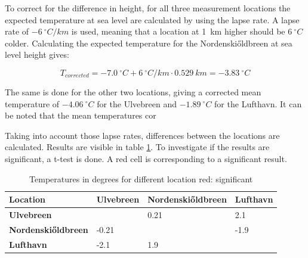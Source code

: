 \documentclass[11pt]{report}
\begin{document}
To correct for the difference in height, for all three measurement locations the expected temperature at sea level are calculated by using the lapse rate. A lapse rate of $\SI{-6}{^{\circ}C/km}$ is used, meaning that a location at \SI{1}{km} higher should be $\SI{6}{^{\circ}C}$ colder.  Calculating the expected temperature for the Nordenski\H{o}ldbreen at sea level height gives:

\begin{equation}
    T_{corrected} = \SI{-7.0}{^\circ C} + \SI{6}{^\circ C/km} \cdot \SI{0.529}{km} = \SI{-3.83}{^\circ C}
    \label{eq:Tatsl}
\end{equation}

The same is done for the other two locations, giving a corrected mean temperature of $\SI{-4.06}{^\circ C}$ for the Ulvebreen and $\SI{-1.89}{^\circ C}$ for the Lufthavn. It can be noted that the mean temperatures cor

Taking into account those lapse rates, differences between the locations are calculated. Results are visible in table \ref{tb:avg}. To investigate if the results are significant, a t-test is done. A red cell is corresponding to a significant result. 

\begin{table}[h]
\begin{tabular}{|l|l|l|l|}
\hline
\textbf{Location}          & \textbf{Ulvebreen}                              & \textbf{Nordenski\H{o}ldbreen}                      & \textbf{Lufthavn}                               \\ \hline
\textbf{Ulvebreen}         & \cellcolor[HTML]{C0C0C0}{\color[HTML]{9B9B9B} } & 0.21                                            & \cellcolor[HTML]{FE996B}2.1                     \\ \hline
\textbf{Nordenski\H{o}ldbreen} & -0.21                                           & \cellcolor[HTML]{C0C0C0}{\color[HTML]{9B9B9B} } & \cellcolor[HTML]{FE996B}-1.9                    \\ \hline
\textbf{Lufthavn}          & \cellcolor[HTML]{FE996B}-2.1                    & \cellcolor[HTML]{FE996B}1.9                     & \cellcolor[HTML]{C0C0C0}{\color[HTML]{9B9B9B} } \\ \hline
\end{tabular}
\caption{Temperatures in degrees for different location red: significant}
\label{tb:avg}
\end{table}
\end{document}
